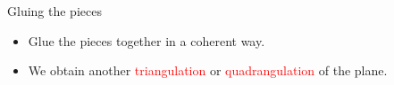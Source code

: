 \documentclass[%
pdf,
colorBG,
slideColor,
]{prosper}
\begin{document}
\begin{slide}{Gluing the pieces}
\begin{itemize}
\item Glue the pieces together in a coherent way.
\item We obtain another \textcolor{red}{triangulation} or \textcolor{red}{quadrangulation} of the plane.
\end{itemize}
\begin{center}
\centering
{}
\end{center}
\end{slide}
\end{document}

